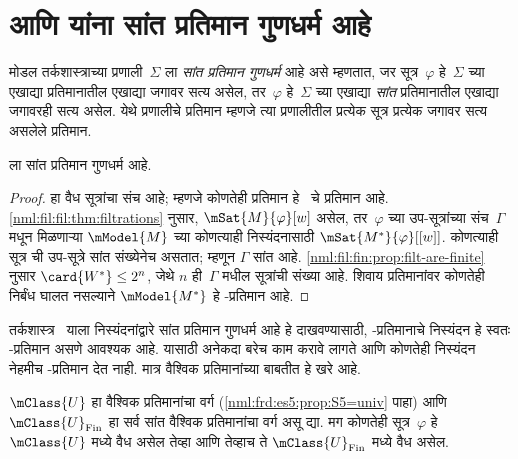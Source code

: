\section{ आणि  यांना सांत प्रतिमान गुणधर्म आहे}\label{nml:fil:fmp:sec}

\begin{defn}
  मोडल तर्कशास्त्राच्या प्रणाली~$\Sigma$ ला
  \emph{सांत प्रतिमान गुणधर्म} आहे असे म्हणतात, जर
  सूत्र~$\varphi$ हे~$\Sigma$ च्या एखाद्या
  प्रतिमानातील एखाद्या जगावर सत्य असेल, तर~$\varphi$
  हे~$\Sigma$ च्या एखाद्या \emph{सांत} प्रतिमानातील
  एखाद्या जगावरही सत्य असेल. येथे प्रणालीचे प्रतिमान म्हणजे
  त्या प्रणालीतील प्रत्येक सूत्र प्रत्येक जगावर सत्य असलेले प्रतिमान.
\end{defn}

\begin{prop}\label{nml:fil:fmp:prop:K-fmp}
   ला सांत प्रतिमान गुणधर्म आहे.
\end{prop}

\begin{proof}
   हा वैध सूत्रांचा संच आहे;
  म्हणजे कोणतेही प्रतिमान हे~ चे प्रतिमान आहे.
  \ref{nml:fil:fil:thm:filtrations} नुसार,
  $\mSat{M}{\varphi}[w]$ असेल, तर~$\varphi$ च्या
  उप-सूत्रांच्या संच~$\Gamma$ मधून मिळणाऱ्या
  $\mModel{M}$ च्या कोणत्याही निस्यंदनासाठी
  $\mSat{M^*}{\varphi}[{[w]}]$. कोणत्याही सूत्र
  ची उप-सूत्रे सांत संख्येनेच असतात; म्हणून
  $\Gamma$ सांत आहे. \ref{nml:fil:fin:prop:filt-are-finite}
  नुसार $\card{W^*} \le 2^n$, जेथे $n$ ही~$\Gamma$
  मधील सूत्रांची संख्या आहे. शिवाय 
  प्रतिमानांवर कोणतेही निर्बंध घालत नसल्याने
  $\mModel{M^*}$ हे -प्रतिमान आहे.
\end{proof}

तर्कशास्त्र~ याला निस्यंदनांद्वारे
सांत प्रतिमान गुणधर्म आहे हे दाखवण्यासाठी,
-प्रतिमानाचे निस्यंदन हे स्वतः
-प्रतिमान असणे आवश्यक आहे. यासाठी
अनेकदा बरेच काम करावे लागते आणि कोणतेही
निस्यंदन नेहमीच -प्रतिमान देत नाही.
मात्र वैश्विक प्रतिमानांच्या बाबतीत हे खरे आहे.

\begin{prop}\label{nml:fil:fmp:prop:univ-fin}
  $\mClass{U}$ हा वैश्विक प्रतिमानांचा वर्ग
  (\ref{nml:frd:es5:prop:S5=univ} पाहा) आणि
  $\mClass{U}_\mathrm{Fin}$ हा सर्व सांत वैश्विक
  प्रतिमानांचा वर्ग असू द्या. मग कोणतेही
  सूत्र~$\varphi$ हे $\mClass{U}$ मध्ये वैध असेल
  तेव्हा आणि तेव्हाच ते $\mClass{U}_\mathrm{Fin}$
  मध्ये वैध असेल.
\end{prop}

